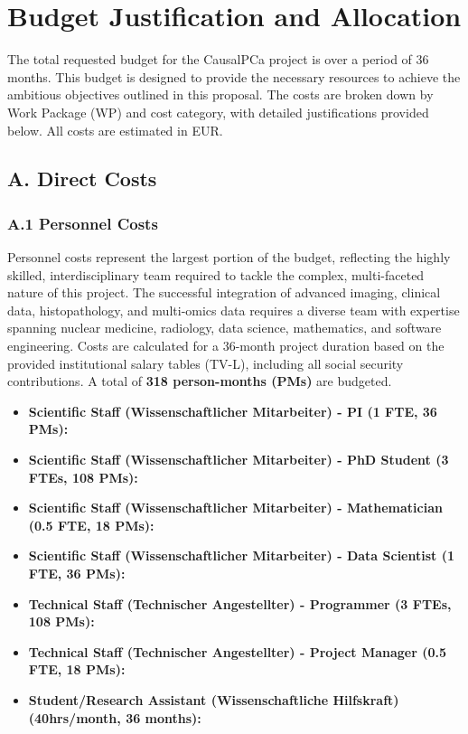 \section*{Budget Justification and Allocation}

The total requested budget for the CausalPCa project is \textbf{} over a period of 36 months. This budget is designed to provide the necessary resources to achieve the ambitious objectives outlined in this proposal. The costs are broken down by Work Package (WP) and cost category, with detailed justifications provided below. All costs are estimated in EUR.

\subsection*{A. Direct Costs}

\subsubsection*{A.1 Personnel Costs}
Personnel costs represent the largest portion of the budget, reflecting the highly skilled, interdisciplinary team required to tackle the complex, multi-faceted nature of this project. The successful integration of advanced imaging, clinical data, histopathology, and multi-omics data requires a diverse team with expertise spanning nuclear medicine, radiology, data science, mathematics, and software engineering. Costs are calculated for a 36-month project duration based on the provided institutional salary tables (TV-L), including all social security contributions. A total of \textbf{318 person-months (PMs)} are budgeted.

\begin{itemize}
    \item \textbf{Scientific Staff (Wissenschaftlicher Mitarbeiter) - PI (1 FTE, 36 PMs):} 
    \item \textbf{Scientific Staff (Wissenschaftlicher Mitarbeiter) - PhD Student (3 FTEs, 108 PMs):} 
    \item \textbf{Scientific Staff (Wissenschaftlicher Mitarbeiter) - Mathematician (0.5 FTE, 18 PMs):} 
    \item \textbf{Scientific Staff (Wissenschaftlicher Mitarbeiter) - Data Scientist (1 FTE, 36 PMs):} 
    \item \textbf{Technical Staff (Technischer Angestellter) - Programmer (3 FTEs, 108 PMs):} 
    \item \textbf{Technical Staff (Technischer Angestellter) - Project Manager (0.5 FTE, 18 PMs):} 
    \item \textbf{Student/Research Assistant (Wissenschaftliche Hilfskraft) (40hrs/month, 36 months):} 
\end{itemize}

